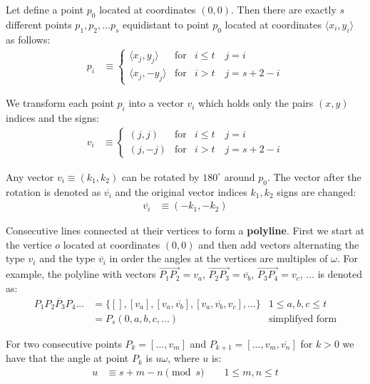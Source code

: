 \documentclass[11pt]{article}
\begin{document}
Let define a point $p_0$ located at coordinates $(0,0)$. Then there are exactly $s$ different points $p_1, p_2, ... p_s$  equidistant to point $p_0$ located at coordinates $\langle x_i,y_i \rangle$ as follows:
\begin{align}
p_i &\equiv \left\{ \begin{array}{ccl}
 \langle x_j,y_j\rangle & \mbox{for} & i \leq t  \quad j = i\\
 \langle x_j, -y_j\rangle & \mbox{for} & i > t \quad j = s+2-i
 \end{array}\right. \label{eq:coords}
\end{align}

We transform each point $p_i$ into a vector $v_i$ which holds only the pairs $(x,y)$ indices and the signs:
\begin{align}
v_i &\equiv \left\{ \begin{array}{ccl}
 ( j, j ) & \mbox{for} & i \leq t \quad j = i\\
 ( j, -j ) & \mbox{for} & i > t \quad j = s+2-i
 \end{array}\right. \label{eq:vectors}
\end{align}

Any vector $v_i \equiv (k_1,k_2)$ can be rotated by $180^\circ$ around $p_0$. The vector after the rotation is denoted as $\overline{v_i}$ and the original vector indices $k_1,k_2$ signs are changed:
\begin{align}
\overline{v_i} &\equiv (-k_1, -k_2) \label{eq:vector180}
\end{align}

Consecutive lines connected at their vertices to form a \textbf{polyline}. First we start at the vertice $o$ located at coordinates $(0,0)$ and then add vectors alternating the type $v_i$ and the type $\overline{v_i}$ in order the angles at the vertices are multiples of $\omega$. For example, the polyline with vectors $\overrightarrow{P_1P_2}=v_a$, $\overrightarrow{P_2P_3}=\overline{v_b}$, $\overrightarrow{P_3P_4}=v_c$, ... is denoted as:
\begin{align}
\overline{P_1P_2P_3P_4...} &= \{ [], [v_a], [v_a,\overline{v_b}],[v_a,\overline{v_b},v_c],... \} 
 & 1 \leq a,b,c \leq t \\
 &= P_s(0,a,b,c,...) & \mbox{simplifyed form}
\end{align}

For two consecutive points $P_k = [...,v_m]$ and $P_{k+1} = [...,v_m,\overline{v_n}]$ for $k>0$ we have that the angle at point $P_k$ is $u\omega$, where $u$ is:
\begin{align}
u &\equiv s + m - n \pmod{s} \quad  \quad 1 \leq m,n \leq t \label{eq:angle}
\end{align}
\end{document}
